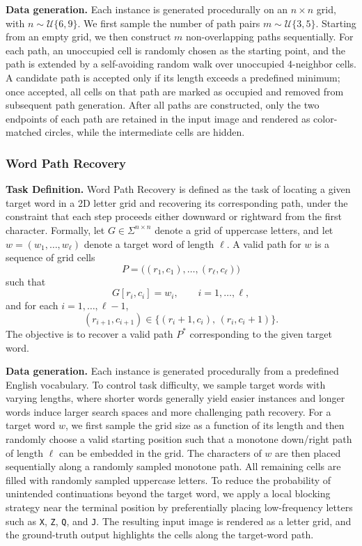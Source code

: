 \documentclass{llmxive}
\begin{document}
\textbf{Data generation.} Each instance is generated procedurally on an \(n \times n\) grid, with
\(n \sim \mathcal{U}\{6,9\}\). We first sample the number of path pairs
\(m \sim \mathcal{U}\{3,5\}\). Starting from an empty grid, we then construct
\(m\) non-overlapping paths sequentially. For each path, an unoccupied cell is
randomly chosen as the starting point, and the path is extended by a
self-avoiding random walk over unoccupied 4-neighbor cells. A candidate path
is accepted only if its length exceeds a predefined minimum; once accepted, all
cells on that path are marked as occupied and removed from subsequent path
generation. After all paths are constructed, only the two endpoints of each path are
retained in the input image and rendered as color-matched circles, while the
intermediate cells are hidden. 

\subsubsection{Word Path Recovery}
\textbf{Task Definition.}
Word Path Recovery is defined as the task of locating a given
target word in a 2D letter grid and recovering its corresponding path, under
the constraint that each step proceeds either downward or rightward from the
first character. Formally, let \(G \in \Sigma^{n \times n}\) denote a grid of uppercase letters,
and let \(w = (w_1, \dots, w_\ell)\) denote a target word of length \(\ell\).
A valid path for \(w\) is a sequence of grid cells
\[
P = \bigl((r_1,c_1), \dots, (r_\ell,c_\ell)\bigr)
\]
such that
\[
G[r_i,c_i] = w_i, \qquad i=1,\dots,\ell,
\]
and for each \(i=1,\dots,\ell-1\),
\[
(r_{i+1},c_{i+1}) \in \{(r_i+1,c_i),\, (r_i,c_i+1)\}.
\]
The objective is to recover a valid path \(P^*\) corresponding to the given
target word.


\textbf{Data generation.}
Each instance is generated procedurally from a predefined English vocabulary.
To control task difficulty, we sample target words with varying lengths, where
shorter words generally yield easier instances and longer words induce larger
search spaces and more challenging path recovery. For a target word \(w\), we
first sample the grid size as a function of its length and then randomly choose
a valid starting position such that a monotone down/right path of length
\(\ell\) can be embedded in the grid. The characters of \(w\) are then placed
sequentially along a randomly sampled monotone path.
All remaining cells are filled with randomly sampled uppercase letters. To
reduce the probability of unintended continuations beyond the target word, we
apply a local blocking strategy near the terminal position by preferentially
placing low-frequency letters such as \texttt{X}, \texttt{Z}, \texttt{Q}, and
\texttt{J}. The resulting input image is rendered as a letter grid, and the
ground-truth output highlights the cells along the target-word path.
\end{document}
